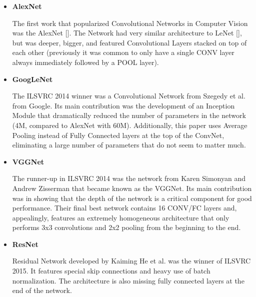 \begin{itemize}
	\item \textbf{AlexNet}
	
	The first work that popularized Convolutional Networks in Computer Vision was the AlexNet []. The Network had very similar architecture to LeNet [], but was deeper, bigger, and featured Convolutional Layers stacked on top of each other (previously it was common to only have a single CONV layer always immediately followed by a POOL layer).
	
	\item \textbf{GoogLeNet}
	
	The ILSVRC 2014 winner was a Convolutional Network from Szegedy et al. from Google. Its main contribution was the development of an Inception Module that dramatically reduced the number of parameters in the network (4M, compared to AlexNet with 60M). Additionally, this paper uses Average Pooling instead of Fully Connected layers at the top of the ConvNet, eliminating a large number of parameters that do not seem to matter much.
	
	\item \textbf{VGGNet}
	
	The runner-up in ILSVRC 2014 was the network from Karen Simonyan and Andrew Zisserman that became known as the VGGNet. Its main contribution was in showing that the depth of the network is a critical component for good performance. Their final best network contains 16 CONV/FC layers and, appealingly, features an extremely homogeneous architecture that only performs 3x3 convolutions and 2x2 pooling from the beginning to the end. 
	
	\item \textbf{ResNet}
	
  	Residual Network developed by Kaiming He et al. was the winner of ILSVRC 2015. It features special skip connections and heavy use of batch normalization. The architecture is also missing fully connected layers at the end of the network.
		 
\end{itemize}







